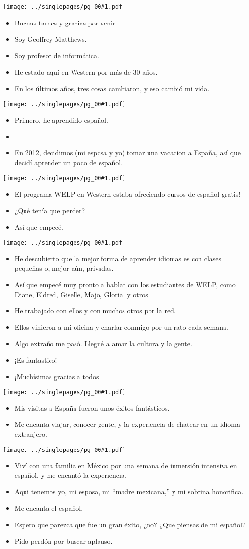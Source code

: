 \documentclass[12pt]{article}
\newcommand{\bi}{\begin{itemize}}
\newcommand{\ei}{\end{itemize}}
\newcommand{\cue}{\mbox{}
  \fbox{\sf Next slide}
}
\newcommand{\fig}[1]{
  \newpage  
  \begin{center}
    \texttt{[image: ../singlepages/pg\_00\#1.pdf]}
  \end{center}
  
}
\begin{document}
\Large


\fig{01}
\bi
\item Buenas tardes y gracias por venir.
\item Soy Geoffrey Matthews.
\item Soy  profesor de informática.
\item He estado aquí en Western por más de 30 años.
\item En los últimos años, tres cosas cambiaron, y eso cambió mi vida.
  \ei
  
\fig{03}

\bi
\item Primero, he aprendido español.
\item \cue
\item En 2012, decidimos (mi esposa y
yo) tomar una vacacion a España, así que decidí aprender un poco de
español.
\ei

\fig{04}

\bi
\item El programa WELP en Western estaba ofreciendo cursos de
  español gratis!
\item ¿Qué tenía que perder?
\item  Así que empecé.
\ei

\fig{05}

\bi
\item He descubierto que la mejor forma de aprender idiomas es con clases
  pequeñas o, mejor aún, privadas.
\item Así que empecé muy pronto a hablar
con los estudiantes de WELP, como Diane, Eldred, Giselle, Majo,
Gloria, y otros.
\item He trabajado con ellos y con muchos otros por la red.
\item Ellos vinieron a mi oficina y charlar conmigo por un
  rato cada semana.
\item  Algo extraño me pasó. Llegué a amar la cultura y la gente.
\item ¡Es fantastico!
\item ¡Muchísimas gracias a todos!
\ei

\fig{06}
\bi
\item Mis visitas a España fueron unos éxitos fantásticos.
\item  Me encanta viajar,
conocer gente, y la experiencia de chatear en un idioma extranjero.
\ei

\fig{07}

\bi
\item Viví con una familia en México por una semana de inmersión intensiva
en español, y me encantó la experiencia.
\item
Aqui tenemos yo, mi esposa, mi ``madre mexicana,'' y mi sobrina
honorifica.  
\item
  Me encanta el español.
\item Espero que parezca que fue un gran
éxito, ¿no?  ¿Que piensas de mi español?
\item Pido perdón por buscar aplauso.
\ei
\end{document}
